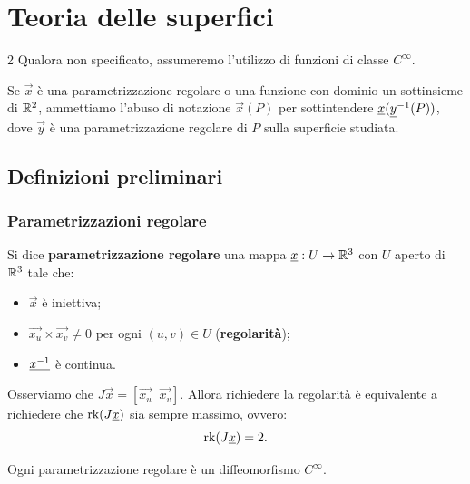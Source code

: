 \chapter{Teoria delle superfici}
\setlength{\parindent}{2pt}

\begin{multicols*}{2}
    Qualora non specificato, assumeremo l'utilizzo di funzioni di classe $C^\infty$. \smallskip

    Se $\vec{x}$ è una parametrizzazione regolare o una funzione con dominio un sottinsieme di $\mathbb{R}^2$,
    ammettiamo l'abuso di notazione $\vec{x}(P)$ per sottintendere ${\underline{x}}({\underline{y}}^{-1}(P))$, dove
    $\vec{y}$ è una parametrizzazione regolare di $P$ sulla superficie studiata.

    \section{Definizioni preliminari}

    \subsection{Parametrizzazioni regolare}

    \begin{definition}
        Si dice \textbf{parametrizzazione regolare} una mappa
        ${\underline{x}} : U \to \mathbb{R}^3$ con $U$ aperto di $\mathbb{R}^3$ tale che:
        \begin{itemize}
            \item $\vec{x}$ è iniettiva;
            \item $\vec{x_u} \times \vec{x_v} \neq 0$ per ogni $(u, v) \in U$ (\textbf{regolarità});
            \item ${\underline{x^{-1}}}$ è continua.
        \end{itemize}
    \end{definition}

    \begin{remark}
        Osserviamo che $J \vec{x} = [\vec{x_u} \;\; \vec{x_v}]$.
        Allora richiedere la regolarità è equivalente a richiedere che $\operatorname{rk}(J {\underline{x}})$ sia sempre massimo,
        ovvero:
        \[ \operatorname{rk}(J {\underline{x}}) = 2. \]
    \end{remark}

    \begin{proposition} \label{prop:parametrizzazione_è_cinf}
        Ogni parametrizzazione regolare è un diffeomorfismo $C^\infty$.
    \end{proposition}


\end{multicols*}
